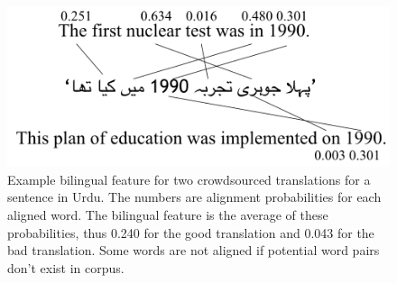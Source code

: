 \documentclass[11pt,letterpaper]{article}
\begin{document}
\begin{figure}
  \centering
  \includegraphics[width=\linewidth]{bilingualexample/example.png}
  \caption{Example bilingual feature for two crowdsourced translations for a sentence in Urdu. The numbers are alignment probabilities for each aligned word. The bilingual feature is the average of these probabilities, thus 0.240 for the good translation and 0.043 for the bad translation. Some words are not aligned if potential word pairs don't exist in corpus.
}
    \label{biexample1}
\end{figure}

\end{document}
